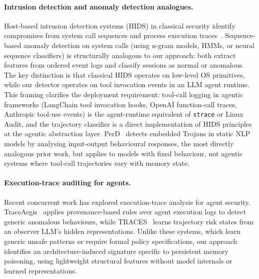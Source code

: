 \documentclass{article}
\begin{document}
\paragraph{Intrusion detection and anomaly detection analogues.} Host-based intrusion detection systems (HIDS) in classical security identify compromises from system call sequences and process execution traces~\citep{forrest1996sense,warrender1999detecting}. Sequence-based anomaly detection on system calls (using n-gram models, HMMs, or neural sequence classifiers) is structurally analogous to our approach: both extract features from ordered event logs and classify sessions as normal or anomalous. The key distinction is that classical HIDS operates on low-level OS primitives, while our detector operates on tool invocation events in an LLM agent runtime. This framing clarifies the deployment requirement: tool-call logging in agentic frameworks (LangChain tool invocation hooks, OpenAI function-call traces, Anthropic tool-use events) is the agent-runtime equivalent of \texttt{strace} or Linux Audit, and the trajectory classifier is a direct implementation of HIDS principles at the agentic abstraction layer. PerD~\citep{garciasoto2022perd} detects embedded Trojans in static NLP models by analysing input-output behavioural responses, the most directly analogous prior work, but applies to models with fixed behaviour, not agentic systems where tool-call trajectories vary with memory state.

\paragraph{Execution-trace auditing for agents.} Recent concurrent work has explored execution-trace analysis for agent security. TraceAegis~\citep{liu2025traceaegis} applies provenance-based rules over agent execution logs to detect generic anomalous behaviours, while TRACES~\citep{wang2025traces} learns trajectory risk states from an observer LLM's hidden representations. Unlike these systems, which learn generic unsafe patterns or require formal policy specifications, our approach identifies an architecture-induced signature specific to persistent memory poisoning, using lightweight structural features without model internals or learned representations.
\end{document}
